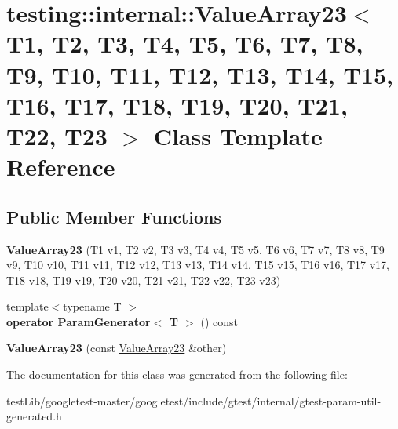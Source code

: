 \hypertarget{classtesting_1_1internal_1_1ValueArray23}{}\section{testing\+:\+:internal\+:\+:Value\+Array23$<$ T1, T2, T3, T4, T5, T6, T7, T8, T9, T10, T11, T12, T13, T14, T15, T16, T17, T18, T19, T20, T21, T22, T23 $>$ Class Template Reference}
\label{classtesting_1_1internal_1_1ValueArray23}
\subsection*{Public Member Functions}
\begin{DoxyCompactItemize}
\item 
\mbox{\label{classtesting_1_1internal_1_1ValueArray23_a39a294eac1033599b11fde99d8c211ac}} 
{\bfseries Value\+Array23} (T1 v1, T2 v2, T3 v3, T4 v4, T5 v5, T6 v6, T7 v7, T8 v8, T9 v9, T10 v10, T11 v11, T12 v12, T13 v13, T14 v14, T15 v15, T16 v16, T17 v17, T18 v18, T19 v19, T20 v20, T21 v21, T22 v22, T23 v23)
\item 
\mbox{\label{classtesting_1_1internal_1_1ValueArray23_a667a3e2676bba0d87007e2b1425431c6}} 
{\footnotesize template$<$typename T $>$ }\\{\bfseries operator Param\+Generator$<$ T $>$} () const
\item 
\mbox{\label{classtesting_1_1internal_1_1ValueArray23_ae953048d6022e967bc710419068f6cb7}} 
{\bfseries Value\+Array23} (const \hyperlink{classtesting_1_1internal_1_1ValueArray23}{Value\+Array23} \&other)
\end{DoxyCompactItemize}


The documentation for this class was generated from the following file\+:\begin{DoxyCompactItemize}
\item 
test\+Lib/googletest-\/master/googletest/include/gtest/internal/gtest-\/param-\/util-\/generated.\+h\end{DoxyCompactItemize}
